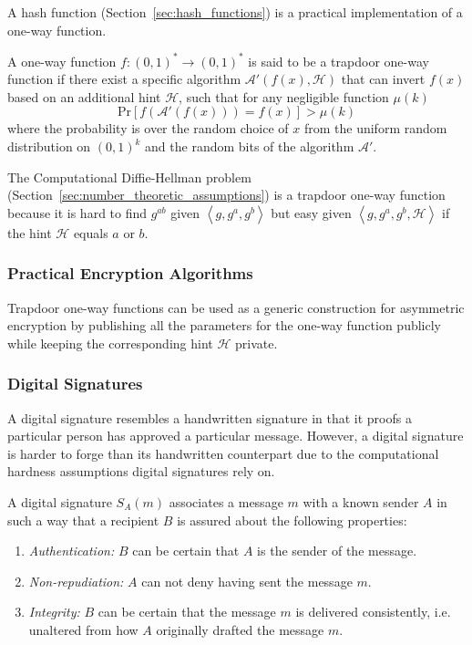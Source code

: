 A hash function (Section~\ref{sec:hash_functions}) is a practical implementation of a one-way function.

\begin{defn}
\label{def:one-way_function}
 A one-way function $f: \left( 0, 1 \right)^* \rightarrow \left( 0, 1 \right)^*$ is said to be a trapdoor one-way function if there exist a specific algorithm $\mathcal{A}' \left( f \left( x \right), \mathcal{H} \right)$ that can invert $f \left( x \right)$ based on an additional hint $\mathcal{H}$, such that for any negligible function $\mu \left( k \right)$ 
 \begin{equation*}
  \textrm{Pr} \left[ f \left( \mathcal{A}' \left( f \left( x \right) \right) \right) = f \left( x \right) \right] > \mu \left( k \right)
 \end{equation*}
 where the probability is over the random choice of $x$ from the uniform random distribution on $\left( 0, 1 \right)^k$ and the random bits of the algorithm $\mathcal{A}'$.
\end{defn} 

The Computational Diffie-Hellman problem (Section~\ref{sec:number_theoretic_assumptions}) is a trapdoor one-way function because it is hard to find $g^{ab}$ given $\left< g, g^a, g^b \right>$ but easy given $\left< g, g^a, g^b, \mathcal{H} \right>$ if the hint $\mathcal{H}$ equals $a$ or $b$.

\subsubsection{Practical Encryption Algorithms}
Trapdoor one-way functions can be used as a generic construction for asymmetric encryption by publishing all the parameters for the one-way function publicly while keeping the corresponding hint $\mathcal{H}$ private.

\subsubsection{Digital Signatures}
A digital signature resembles a handwritten signature in that it proofs a particular person has approved a particular message. However, a digital signature is harder to forge than its handwritten counterpart due to the computational hardness assumptions digital signatures rely on.

\begin{defn}
\label{def:digital_signature}
 A digital signature $S_A \left( m \right)$ associates a message $m$ with a known sender $A$ in such a way that a recipient $B$ is assured about the following properties:
 \begin{enumerate}
  \item \textit{Authentication:} $B$ can be certain that $A$ is the sender of the message.
  \item \textit{Non-repudiation:} $A$ can not deny having sent the message $m$.
  \item \textit{Integrity:} $B$ can be certain that the message $m$ is delivered consistently, i.e. unaltered from how $A$ originally drafted the message $m$.
 \end{enumerate}
\end{defn}

